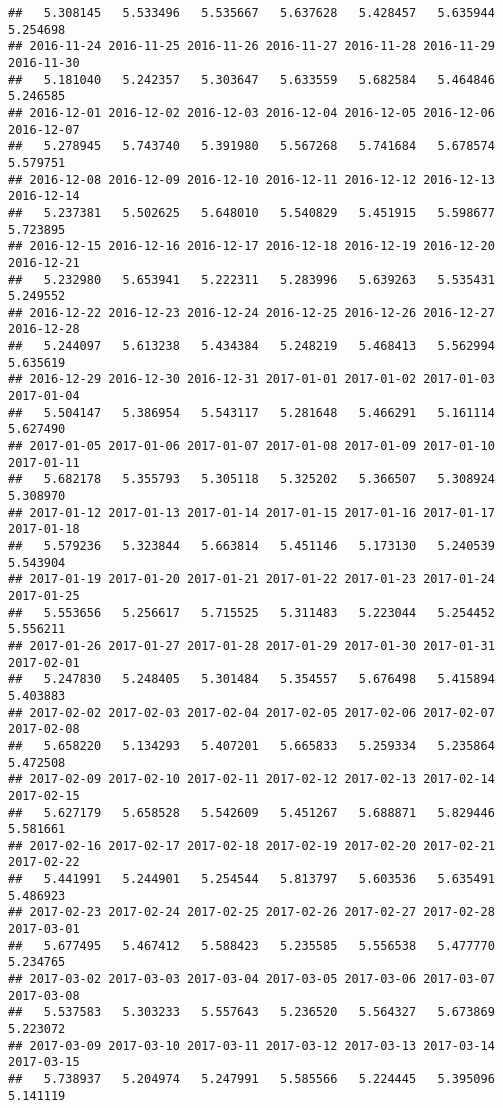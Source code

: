 \documentclass[
]{article}
\begin{document}
\begin{verbatim}
##   5.308145   5.533496   5.535667   5.637628   5.428457   5.635944   5.254698 
## 2016-11-24 2016-11-25 2016-11-26 2016-11-27 2016-11-28 2016-11-29 2016-11-30 
##   5.181040   5.242357   5.303647   5.633559   5.682584   5.464846   5.246585 
## 2016-12-01 2016-12-02 2016-12-03 2016-12-04 2016-12-05 2016-12-06 2016-12-07 
##   5.278945   5.743740   5.391980   5.567268   5.741684   5.678574   5.579751 
## 2016-12-08 2016-12-09 2016-12-10 2016-12-11 2016-12-12 2016-12-13 2016-12-14 
##   5.237381   5.502625   5.648010   5.540829   5.451915   5.598677   5.723895 
## 2016-12-15 2016-12-16 2016-12-17 2016-12-18 2016-12-19 2016-12-20 2016-12-21 
##   5.232980   5.653941   5.222311   5.283996   5.639263   5.535431   5.249552 
## 2016-12-22 2016-12-23 2016-12-24 2016-12-25 2016-12-26 2016-12-27 2016-12-28 
##   5.244097   5.613238   5.434384   5.248219   5.468413   5.562994   5.635619 
## 2016-12-29 2016-12-30 2016-12-31 2017-01-01 2017-01-02 2017-01-03 2017-01-04 
##   5.504147   5.386954   5.543117   5.281648   5.466291   5.161114   5.627490 
## 2017-01-05 2017-01-06 2017-01-07 2017-01-08 2017-01-09 2017-01-10 2017-01-11 
##   5.682178   5.355793   5.305118   5.325202   5.366507   5.308924   5.308970 
## 2017-01-12 2017-01-13 2017-01-14 2017-01-15 2017-01-16 2017-01-17 2017-01-18 
##   5.579236   5.323844   5.663814   5.451146   5.173130   5.240539   5.543904 
## 2017-01-19 2017-01-20 2017-01-21 2017-01-22 2017-01-23 2017-01-24 2017-01-25 
##   5.553656   5.256617   5.715525   5.311483   5.223044   5.254452   5.556211 
## 2017-01-26 2017-01-27 2017-01-28 2017-01-29 2017-01-30 2017-01-31 2017-02-01 
##   5.247830   5.248405   5.301484   5.354557   5.676498   5.415894   5.403883 
## 2017-02-02 2017-02-03 2017-02-04 2017-02-05 2017-02-06 2017-02-07 2017-02-08 
##   5.658220   5.134293   5.407201   5.665833   5.259334   5.235864   5.472508 
## 2017-02-09 2017-02-10 2017-02-11 2017-02-12 2017-02-13 2017-02-14 2017-02-15 
##   5.627179   5.658528   5.542609   5.451267   5.688871   5.829446   5.581661 
## 2017-02-16 2017-02-17 2017-02-18 2017-02-19 2017-02-20 2017-02-21 2017-02-22 
##   5.441991   5.244901   5.254544   5.813797   5.603536   5.635491   5.486923 
## 2017-02-23 2017-02-24 2017-02-25 2017-02-26 2017-02-27 2017-02-28 2017-03-01 
##   5.677495   5.467412   5.588423   5.235585   5.556538   5.477770   5.234765 
## 2017-03-02 2017-03-03 2017-03-04 2017-03-05 2017-03-06 2017-03-07 2017-03-08 
##   5.537583   5.303233   5.557643   5.236520   5.564327   5.673869   5.223072 
## 2017-03-09 2017-03-10 2017-03-11 2017-03-12 2017-03-13 2017-03-14 2017-03-15 
##   5.738937   5.204974   5.247991   5.585566   5.224445   5.395096   5.141119 

\end{verbatim}
\end{document}
